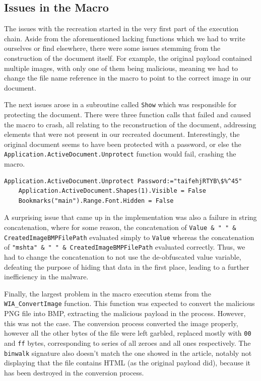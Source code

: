 \subsection{Issues in the Macro}
The issues with the recreation started in the very first part of the execution chain. Aside from the aforementioned
lacking functions which we had to write ourselves or find elsewhere, there were some issues stemming from the
construction of the document itself. For example, the original payload contained multiple images, with only one of them
being malicious, meaning we had to change the file name reference in the macro to point to the correct image in our
document.

The next issues arose in a subroutine called \verb+Show+ which was responsible for protecting the document. There were
three function calls that failed and caused the macro to crash, all relating to the reconstruction of the document,
addressing elements that were not present in our recreated document. Interestingly, the original document seems to have
been protected with a password, or else the \verb+Application.ActiveDocument.Unprotect+ function would fail, crashing
the macro.

\begin{lstlisting}[language=VBScript, caption={Failing function calls from the document protection subroutine}]
    Application.ActiveDocument.Unprotect Password:="taifehjRTYB\$%^45"
    Application.ActiveDocument.Shapes(1).Visible = False
    Bookmarks("main").Range.Font.Hidden = False
\end{lstlisting}

A surprising issue that came up in the implementation was also a failure in string concatenation, where for some reason,
the concatenation of \verb+Value & " " & CreatedImageBMPFilePath+ evaluated simply to \verb+Value+ whereas the
concatenation of \verb+"mshta" & " " & CreatedImageBMPFilePath+ evaluated correctly. Thus, we had to change the
concatenation to not use the de-obfuscated value variable, defeating the purpose of hiding that data in the first place,
leading to a further inefficiency in the malware.

Finally, the largest problem in the macro execution stems from the \verb+WIA_ConvertImage+ function. This function was
expected to convert the malicious \acrshort{PNG} file into \acrshort{BMP}, extracting the malicious payload in the
process. However, this was not the case. The conversion process converted the image properly, however all the other
bytes of the file were left garbled, replaced mostly with \verb+00+ and \verb+ff+ bytes, corresponding to series of
all zeroes and all ones respectively. The \verb+binwalk+ signature also doesn't match the one showed in the article,
notably not displaying that the file contains \acrshort{HTML} (as the original payload did), because it has been 
destroyed in the conversion process.

